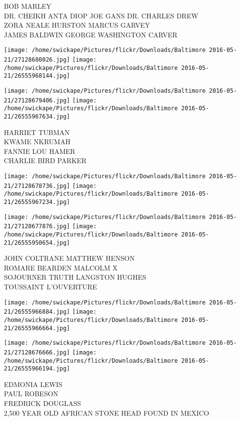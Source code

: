 \documentclass[10pt,letterpaper]{article}
\begin{document}
BOB MARLEY\\
DR. CHEIKH ANTA DIOP JOE GANS DR. CHARLES DREW\\
ZORA NEALE HURSTON MARCUS GARVEY\\
JAMES BALDWIN GEORGE WASHINGTON CARVER
\pagebreak

\texttt{[image: /home/swickape/Pictures/flickr/Downloads/Baltimore 2016-05-21/27128680026.jpg]}
\texttt{[image: /home/swickape/Pictures/flickr/Downloads/Baltimore 2016-05-21/26555968144.jpg]}

\texttt{[image: /home/swickape/Pictures/flickr/Downloads/Baltimore 2016-05-21/27128679406.jpg]}
\texttt{[image: /home/swickape/Pictures/flickr/Downloads/Baltimore 2016-05-21/26555967634.jpg]}

HARRIET TUBMAN\\
KWAME NKRUMAH\\
FANNIE LOU HAMER\\
CHARLIE BIRD PARKER
\pagebreak

\texttt{[image: /home/swickape/Pictures/flickr/Downloads/Baltimore 2016-05-21/27128678736.jpg]}
\texttt{[image: /home/swickape/Pictures/flickr/Downloads/Baltimore 2016-05-21/26555967234.jpg]}

\texttt{[image: /home/swickape/Pictures/flickr/Downloads/Baltimore 2016-05-21/27128677876.jpg]}
\texttt{[image: /home/swickape/Pictures/flickr/Downloads/Baltimore 2016-05-21/26555950654.jpg]}

JOHN COLTRANE MATTHEW HENSON\\
ROMARE BEARDEN MALCOLM X\\
SOJOURNER TRUTH LANGSTON HUGHES\\
TOUSSAINT L'OUVERTURE
\pagebreak

\texttt{[image: /home/swickape/Pictures/flickr/Downloads/Baltimore 2016-05-21/26555966884.jpg]}
\texttt{[image: /home/swickape/Pictures/flickr/Downloads/Baltimore 2016-05-21/26555966664.jpg]}

\texttt{[image: /home/swickape/Pictures/flickr/Downloads/Baltimore 2016-05-21/27128676666.jpg]}
\texttt{[image: /home/swickape/Pictures/flickr/Downloads/Baltimore 2016-05-21/26555966194.jpg]}

EDMONIA LEWIS\\
PAUL ROBESON\\
FREDRICK DOUGLASS\\
2,500 YEAR OLD AFRICAN STONE HEAD FOUND IN MEXICO
\pagebreak
\end{document}
